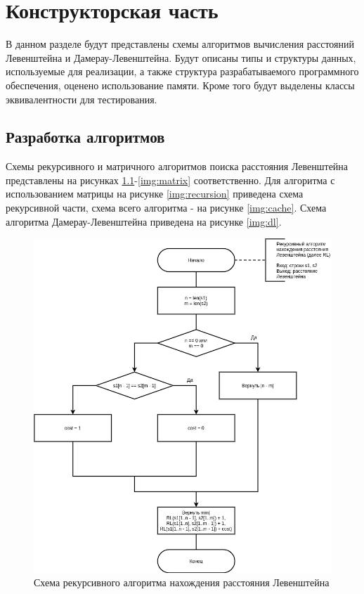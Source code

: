 \chapter{Конструкторская часть}

В данном разделе будут представлены схемы алгоритмов вычисления расстояний Левенштейна и Дамерау-Левенштейна. Будут описаны типы и структуры данных, используемые для реализации, а также структура разрабатываемого программного обеспечения, оценено использование памяти. Кроме того будут выделены классы эквивалентности для тестирования.

\section{Разработка алгоритмов}

Схемы рекурсивного и матричного алгоритмов поиска расстояния Левенштейна представлены на рисунках \ref{img:recursive}-\ref{img:matrix} соответственно. Для алгоритма с использованием матрицы на рисунке \ref{img:recursion} приведена схема рекурсивной части, схема всего алгоритма - на рисунке \ref{img:cache}. Схема алгоритма Дамерау-Левенштейна приведена на рисунке \ref{img:dl}.

\begin{figure}[H]
	\begin{center}
		\includegraphics[scale=0.6]{img/recursive.png}
	\end{center}
	\captionsetup{justification=centering}
	\caption{Схема рекурсивного алгоритма нахождения расстояния Левенштейна}
	\label{img:recursive}
\end{figure}

